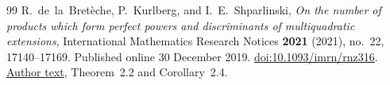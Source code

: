\begin{thebibliography}{99}
R.~de~la~Bret\`eche, P.~Kurlberg, and I.~E.~Shparlinski,
\emph{On the number of products which form perfect powers and
discriminants of multiquadratic extensions},
International Mathematics Research Notices \textbf{2021} (2021),
no.~22, 17140--17169. Published online 30 December 2019.
\href{https://doi.org/10.1093/imrn/rnz316}
{doi:10.1093/imrn/rnz316}.
\href{https://kurlberg.github.io/eprints/SquareProduct.pdf}
{Author text}, Theorem~2.2 and Corollary~2.4.

\end{thebibliography}

